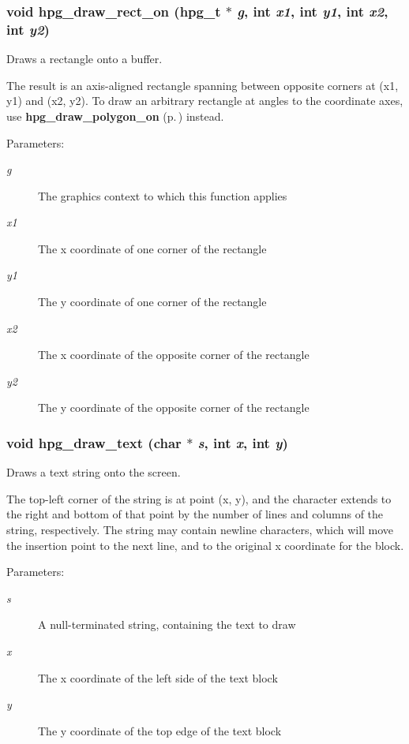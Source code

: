 \subsubsection{\setlength{\rightskip}{0pt plus 5cm}void hpg\_\-draw\_\-rect\_\-on ({\bf hpg\_\-t} $\ast$ {\em g}, int {\em x1}, int {\em y1}, int {\em x2}, int {\em y2})}\label{hpgraphics_8h_a44}


Draws a rectangle onto a buffer.

The result is an axis-aligned rectangle spanning between opposite corners at (x1, y1) and (x2, y2). To draw an arbitrary rectangle at angles to the coordinate axes, use {\bf hpg\_\-draw\_\-polygon\_\-on} {\rm (p.\,\pageref{hpgraphics_8h_a52})} instead.\begin{Desc}
\item[Parameters: ]\par
\begin{description}
\item[{\em 
g}]The graphics context to which this function applies \item[{\em 
x1}]The x coordinate of one corner of the rectangle \item[{\em 
y1}]The y coordinate of one corner of the rectangle \item[{\em 
x2}]The x coordinate of the opposite corner of the rectangle \item[{\em 
y2}]The y coordinate of the opposite corner of the rectangle \end{description}
\end{Desc}
\subsubsection{\setlength{\rightskip}{0pt plus 5cm}void hpg\_\-draw\_\-text (char $\ast$ {\em s}, int {\em x}, int {\em y})}\label{hpgraphics_8h_a61}


Draws a text string onto the screen.

The top-left corner of the string is at point (x, y), and the character extends to the right and bottom of that point by the number of lines and columns of the string, respectively. The string may contain newline characters, which will move the insertion point to the next line, and to the original x coordinate for the block.\begin{Desc}
\item[Parameters: ]\par
\begin{description}
\item[{\em 
s}]A null-terminated string, containing the text to draw \item[{\em 
x}]The x coordinate of the left side of the text block \item[{\em 
y}]The y coordinate of the top edge of the text block \end{description}
\end{Desc}
